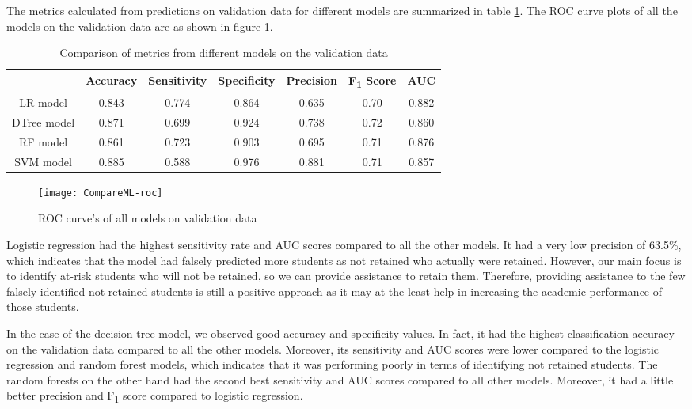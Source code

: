 \documentclass[11pt,openright]{report}
\begin{document}
The metrics calculated from predictions on validation data for different models are summarized in table \ref{table:compare_models_db}. The ROC curve plots of all the models on the validation data are as shown in figure \ref{fig:comparison_roc}.

\begin{table}[!htb]
	\renewcommand{\arraystretch}{1.3}
	\caption{Comparison of metrics from different models on the validation data}
	\label{table:compare_models_db}
	\centering
	\begin{tabular}{|c|c|c|c|c|c|c|}
    \hline
  	 & \bfseries Accuracy & \bfseries Sensitivity & \bfseries Specificity & \bfseries Precision & \bfseries F\textsubscript{1} Score  & \bfseries AUC\\  
    \hline
    	LR model & 0.843 & 0.774 & 0.864 & 0.635 & 0.70 & 0.882 \\ \hline
	DTree model & 0.871 & 0.699 & 0.924 & 0.738 & 0.72 & 0.860 \\ \hline
	RF model & 0.861 & 0.723 & 0.903 & 0.695 & 0.71 & 0.876 \\ \hline
	SVM model & 0.885 & 0.588 & 0.976 & 0.881 & 0.71 & 0.857 \\ \hline
	\end{tabular} 
\end{table}


 \begin{figure}[!htb]
	\centering
	\texttt{[image: CompareML-roc]}
	\caption{ROC curve's of all models on validation data}
	\label{fig:comparison_roc}
\end{figure} 

Logistic regression had the highest sensitivity rate and AUC scores compared to all the other models. It had a very low precision of 63.5\%, which indicates that the model had falsely predicted more students as not retained who actually were retained. However, our main focus is to identify at-risk students who will not be retained, so we can provide assistance to retain them. Therefore, providing assistance to the few falsely identified not retained students is still a positive approach as it may at the least help in increasing the academic performance of those students. 
 
In the case of the decision tree model, we observed good accuracy and specificity values. In fact, it had the highest classification accuracy on the validation data compared to all the other models. Moreover, its sensitivity and AUC scores were lower compared to the logistic regression and random forest models, which indicates that it was performing poorly in terms of identifying not retained students. The random forests on the other hand had the second best sensitivity and AUC scores compared to all other models. Moreover, it had a little better precision and F\textsubscript{1} score compared to logistic regression.
\end{document}
